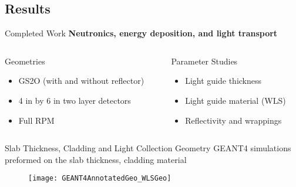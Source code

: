 \subsection{Results}
\begin{frame}{Completed Work}
  \textbf{Neutronics, energy deposition, and light transport}
  \vspace{0.5cm}
  \begin{columns}[onlytextwidth]
    \begin{column}{0.45\textwidth}
      Geometries
      \begin{itemize}
        \item GS2O  (with and without reflector)
        \item 4 in by 6 in two layer detectors
        \item Full RPM
      \end{itemize}
    \end{column}
    \begin{column}{0.45\textwidth}
      Parameter Studies
      \begin{itemize}
        \item Light guide thickness
        \item Light guide material (WLS)
        \item Reflectivity and wrappings
      \end{itemize}
    \end{column}
  \end{columns}
\hyperlink{G4Intro}{}
\end{frame}
\begin{frame}{Slab Thickness, Cladding and Light Collection Geometry}
GEANT4 simulations preformed on the slab thickness, cladding material
  \begin{figure}
    \centering
    \texttt{[image: GEANT4AnnotatedGeo\_WLSGeo]}
  \end{figure}
\end{frame}
